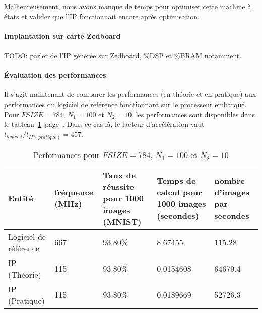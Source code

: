 Malheureusement, nous avons manque de temps pour optimiser cette machine à états
et valider que l'IP fonctionnait encore après optimisation.

\paragraph{Implantation sur carte Zedboard\\}

TODO: parler de l'IP générée sur Zedboard, \%DSP et \%BRAM notamment.


\paragraph{\'{E}valuation des performances\\}

Il s'agit maintenant de comparer les performances (en théorie et en pratique)
aux performances du logiciel de référence fonctionnant sur le processeur embarqué.\\

Pour $FSIZE = 784$, $N_1 = 100$ et $N_2 = 10$, les performances sont disponibles
dans le tableau~\ref{fig:perf_100}~page~\pageref{fig:perf_100}.
Dans ce cas-là, le facteur d'accélération vaut $t_{logiciel}/t_{IP (pratique)} = 457$.\\
\begin{table}[h!]
	\centering
	\begin{tabular}{| p{} | p{} | p{} | p{} | p{} |}
		\hline
		Entité & fréquence (MHz) & Taux de réussite pour 1000 images (MNIST) & Temps de calcul pour 1000 images (secondes) & nombre d'images par secondes\\
		\hline
		Logiciel de référence & 667 & 93.80\% &  8.67455 & 115.28\\
		IP (Théorie) & 115 &  93.80\% & 0.0154608 & 64679.4\\
		IP (Pratique) & 115 &  93.80\% & 0.0189669 & 52726.3\\
		\hline
	\end{tabular}
	\caption{Performances pour $FSIZE = 784$, $N_1 = 100$ et $N_2 = 10$}
	\label{fig:perf_100}
\end{table}

